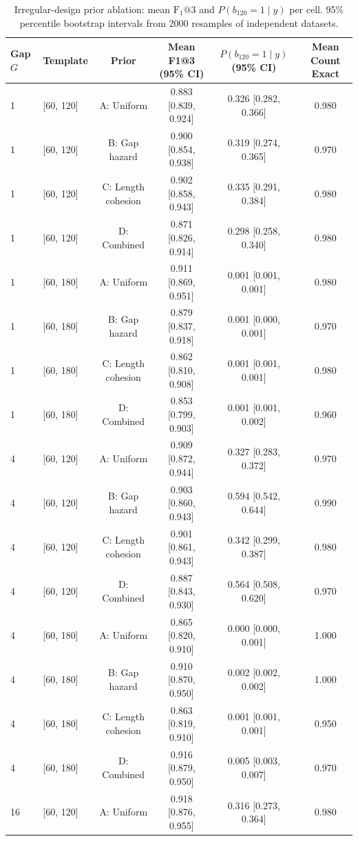 \begin{table}[!htbp]
\centering\small
\caption{Irregular-design prior ablation: mean $\mathrm{F_1}@3$ and $P(b_{120}=1\mid y)$ per cell. 95\% percentile bootstrap intervals from 2000 resamples of independent datasets.}
\label{tab:planned-E03-prior-paper}
\begin{tabular}{@{}llcccc@{}}
\toprule
Gap $G$ & Template & Prior & Mean F1@3 (95\% CI) & $P(b_{120}=1\mid y)$ (95\% CI) & Mean Count Exact \\
\midrule
1 & [60, 120] & A: Uniform & 0.883 [0.839, 0.924] & 0.326 [0.282, 0.366] & 0.980 \\
1 & [60, 120] & B: Gap hazard & 0.900 [0.854, 0.938] & 0.319 [0.274, 0.365] & 0.970 \\
1 & [60, 120] & C: Length cohesion & 0.902 [0.858, 0.943] & 0.335 [0.291, 0.384] & 0.980 \\
1 & [60, 120] & D: Combined & 0.871 [0.826, 0.914] & 0.298 [0.258, 0.340] & 0.980 \\
1 & [60, 180] & A: Uniform & 0.911 [0.869, 0.951] & 0.001 [0.001, 0.001] & 0.980 \\
1 & [60, 180] & B: Gap hazard & 0.879 [0.837, 0.918] & 0.001 [0.000, 0.001] & 0.970 \\
1 & [60, 180] & C: Length cohesion & 0.862 [0.810, 0.908] & 0.001 [0.001, 0.001] & 0.980 \\
1 & [60, 180] & D: Combined & 0.853 [0.799, 0.903] & 0.001 [0.001, 0.002] & 0.960 \\
4 & [60, 120] & A: Uniform & 0.909 [0.872, 0.944] & 0.327 [0.283, 0.372] & 0.970 \\
4 & [60, 120] & B: Gap hazard & 0.903 [0.860, 0.943] & 0.594 [0.542, 0.644] & 0.990 \\
4 & [60, 120] & C: Length cohesion & 0.901 [0.861, 0.943] & 0.342 [0.299, 0.387] & 0.980 \\
4 & [60, 120] & D: Combined & 0.887 [0.843, 0.930] & 0.564 [0.508, 0.620] & 0.970 \\
4 & [60, 180] & A: Uniform & 0.865 [0.820, 0.910] & 0.000 [0.000, 0.001] & 1.000 \\
4 & [60, 180] & B: Gap hazard & 0.910 [0.870, 0.950] & 0.002 [0.002, 0.002] & 1.000 \\
4 & [60, 180] & C: Length cohesion & 0.863 [0.819, 0.910] & 0.001 [0.001, 0.001] & 0.950 \\
4 & [60, 180] & D: Combined & 0.916 [0.879, 0.950] & 0.005 [0.003, 0.007] & 0.970 \\
16 & [60, 120] & A: Uniform & 0.918 [0.876, 0.955] & 0.316 [0.273, 0.364] & 0.980 \\

\end{tabular}
\end{table}
